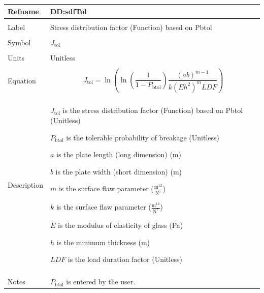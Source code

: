 \documentclass[12pt]{article}
\begin{document}
\vspace{\baselineskip}
\noindent
\begin{minipage}{\textwidth}
\begin{tabular}{>{\raggedright}p{}>{\raggedright\arraybackslash}p{}}
\toprule \textbf{Refname} & \textbf{DD:sdfTol}
\label{DD:sdfTol}
\\ \midrule \\
Label & Stress distribution factor (Function) based on Pbtol
        
\\ \midrule \\
Symbol & ${J_{\text{tol}}}$
         
\\ \midrule \\
Units & Unitless
        
\\ \midrule \\
Equation & \begin{displaymath}
           {J_{\text{tol}}}=\ln\left(\ln\left(\frac{1}{1-{P_{\text{b}\text{tol}}}}\right) \frac{\left(a b\right)^{m-1}}{k \left(E h^{2}\right)^{m} LDF}\right)
           \end{displaymath}
\\ \midrule \\
Description & \begin{symbDescription}
              \item{${J_{\text{tol}}}$ is the stress distribution factor (Function) based on Pbtol (Unitless)}
              \item{${P_{\text{b}\text{tol}}}$ is the tolerable probability of breakage (Unitless)}
              \item{$a$ is the plate length (long dimension) (m)}
              \item{$b$ is the plate width (short dimension) (m)}
              \item{$m$ is the surface flaw parameter ($\frac{\text{m}^{12}}{\text{N}^{7}}$)}
              \item{$k$ is the surface flaw parameter ($\frac{\text{m}^{12}}{\text{N}^{7}}$)}
              \item{$E$ is the modulus of elasticity of glass (Pa)}
              \item{$h$ is the minimum thickness (m)}
              \item{$LDF$ is the load duration factor (Unitless)}
              \end{symbDescription}
\\ \midrule \\
Notes & ${P_{\text{b}\text{tol}}}$ is entered by the user.
        

\end{tabular}
\end{minipage}
\end{document}
